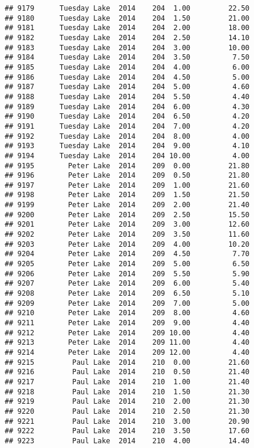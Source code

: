 \documentclass[
]{article}
\begin{document}
\begin{verbatim}
## 9179      Tuesday Lake  2014    204  1.00         22.50
## 9180      Tuesday Lake  2014    204  1.50         21.00
## 9181      Tuesday Lake  2014    204  2.00         18.00
## 9182      Tuesday Lake  2014    204  2.50         14.10
## 9183      Tuesday Lake  2014    204  3.00         10.00
## 9184      Tuesday Lake  2014    204  3.50          7.50
## 9185      Tuesday Lake  2014    204  4.00          6.00
## 9186      Tuesday Lake  2014    204  4.50          5.00
## 9187      Tuesday Lake  2014    204  5.00          4.60
## 9188      Tuesday Lake  2014    204  5.50          4.40
## 9189      Tuesday Lake  2014    204  6.00          4.30
## 9190      Tuesday Lake  2014    204  6.50          4.20
## 9191      Tuesday Lake  2014    204  7.00          4.20
## 9192      Tuesday Lake  2014    204  8.00          4.00
## 9193      Tuesday Lake  2014    204  9.00          4.10
## 9194      Tuesday Lake  2014    204 10.00          4.00
## 9195        Peter Lake  2014    209  0.00         21.80
## 9196        Peter Lake  2014    209  0.50         21.80
## 9197        Peter Lake  2014    209  1.00         21.60
## 9198        Peter Lake  2014    209  1.50         21.50
## 9199        Peter Lake  2014    209  2.00         21.40
## 9200        Peter Lake  2014    209  2.50         15.50
## 9201        Peter Lake  2014    209  3.00         12.60
## 9202        Peter Lake  2014    209  3.50         11.60
## 9203        Peter Lake  2014    209  4.00         10.20
## 9204        Peter Lake  2014    209  4.50          7.70
## 9205        Peter Lake  2014    209  5.00          6.50
## 9206        Peter Lake  2014    209  5.50          5.90
## 9207        Peter Lake  2014    209  6.00          5.40
## 9208        Peter Lake  2014    209  6.50          5.10
## 9209        Peter Lake  2014    209  7.00          5.00
## 9210        Peter Lake  2014    209  8.00          4.60
## 9211        Peter Lake  2014    209  9.00          4.40
## 9212        Peter Lake  2014    209 10.00          4.40
## 9213        Peter Lake  2014    209 11.00          4.40
## 9214        Peter Lake  2014    209 12.00          4.40
## 9215         Paul Lake  2014    210  0.00         21.60
## 9216         Paul Lake  2014    210  0.50         21.40
## 9217         Paul Lake  2014    210  1.00         21.40
## 9218         Paul Lake  2014    210  1.50         21.30
## 9219         Paul Lake  2014    210  2.00         21.30
## 9220         Paul Lake  2014    210  2.50         21.30
## 9221         Paul Lake  2014    210  3.00         20.90
## 9222         Paul Lake  2014    210  3.50         17.60
## 9223         Paul Lake  2014    210  4.00         14.40

\end{verbatim}
\end{document}

